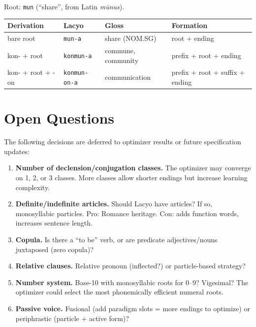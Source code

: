 \documentclass[12pt]{book}
\begin{document}
Root: \texttt{mun} (``share'', from Latin \emph{m\={u}nus}).

\begin{tabular}{@{}llll@{}}
\toprule
Derivation & Lacyo & Gloss & Formation \\
\midrule
bare root & \texttt{mun-a} & share (NOM.SG) & root + ending \\
kon- + root & \texttt{konmun-a} & commune, community & prefix + root + ending \\
kon- + root + -on & \texttt{konmun-on-a} & communication & prefix + root + suffix + ending \\
\bottomrule
\end{tabular}


\chapter{Open Questions}
\label{ch:open}

The following decisions are deferred to optimizer results or future
specification updates:

\begin{enumerate}
  \item \textbf{Number of declension/conjugation classes.}
        The optimizer may converge on 1, 2, or 3 classes. More classes
        allow shorter endings but increase learning complexity.
  \item \textbf{Definite/indefinite articles.}
        Should Lacyo have articles? If so, monosyllabic particles.
        Pro: Romance heritage. Con: adds function words, increases
        sentence length.
  \item \textbf{Copula.}
        Is there a ``to be'' verb, or are predicate adjectives/nouns
        juxtaposed (zero copula)?
  \item \textbf{Relative clauses.}
        Relative pronoun (inflected?) or particle-based strategy?
  \item \textbf{Number system.}
        Base-10 with monosyllabic roots for 0--9? Vigesimal? The optimizer
        could select the most phonemically efficient numeral roots.
  \item \textbf{Passive voice.}
        Fusional (add paradigm slots = more endings to optimize) or
        periphrastic (particle + active form)?
\end{enumerate}
\end{document}
